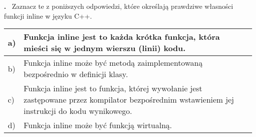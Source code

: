 \documentclass[a4paper,12pt,twoside]{article}
\newcounter{zad}
\newcommand{\zadanie}{\addtocounter{zad}{1} \medskip \noindent \textbf{\thezad. }}
\newcommand{\pytanie}[1]{\vspace{1mm}\zadanie~#1}
\newcommand{\odpowiedzi}[4]{
\vspace{2mm}
\begin{tabular}{|p{3mm}|p{14cm}|p{3mm}|}
\hline
a) & #1 & \\ \hline
b) & #2 & \\ \hline
c) & #3 & \\ \hline
d) & #4 & \\ \hline
\end{tabular}
\vspace{2mm}
}
\begin{document}
\dotfill \par \dotfill \par \dotfill 










\pytanie{Zaznacz te z poniższych odpowiedzi, które określają prawdziwe własności funkcji inline w języku C++.}

\odpowiedzi
{Funkcja inline jest to każda krótka funkcja, która mieści się w jednym wierszu (linii) kodu.}  
{Funkcja inline może być metodą zaimplementowaną bezpośrednio w definicji klasy.}  
{Funkcja inline jest to funkcja, której wywołanie jest zastępowane przez kompilator bezpośrednim wstawieniem jej instrukcji do kodu wynikowego.}  
{Funkcja inline może być funkcją wirtualną.}  
\end{document}
